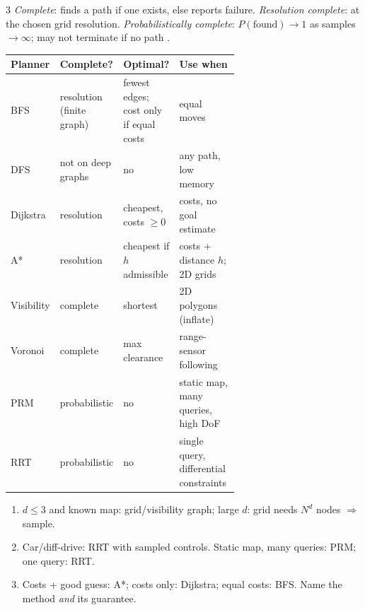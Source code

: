 \begin{multicols}{3}
\label{w12:which}
\emph{Complete}: finds a path if one exists, else reports failure. \emph{Resolution complete}: at the chosen grid resolution. \emph{Probabilistically complete}: $P(\text{found})\to1$ as samples $\to\infty$; may not terminate if no path .\par
\scriptsize\setlength{\tabcolsep}{2pt}
\begin{tabularx}{\linewidth}{@{}>{\raggedright\arraybackslash}p{0.17\linewidth}>{\raggedright\arraybackslash}p{0.25\linewidth}>{\raggedright\arraybackslash}p{0.22\linewidth}>{\raggedright\arraybackslash}X@{}}\toprule
Planner & Complete? & Optimal? & Use when\\\midrule
BFS & resolution (finite graph) & fewest edges; cost only if equal costs & equal moves\\
DFS & not on deep graphs & no & any path, low memory\\
Dijkstra & resolution & cheapest, costs $\ge0$ & costs, no goal estimate\\
A* & resolution & cheapest if $h$ admissible & costs + distance $h$; 2D grids\\
Visibility & complete & shortest & 2D polygons (inflate)\\
Voronoi & complete & max clearance & range-sensor following\\
PRM & probabilistic & no & static map, many queries, high DoF\\
RRT & probabilistic & no & single query, differential constraints\\\bottomrule
\end{tabularx}
\normalsize
\begin{recipe}
\begin{enumerate}
\item $d\le3$ and known map: grid/visibility graph; large $d$: grid needs $N^d$ nodes $\Rightarrow$ sample.
\item Car/diff-drive: RRT with sampled controls. Static map, many queries: PRM; one query: RRT.
\item Costs + good guess: A*; costs only: Dijkstra; equal costs: BFS. Name the method \emph{and} its guarantee.
\end{enumerate}
\end{recipe}


\end{multicols}

